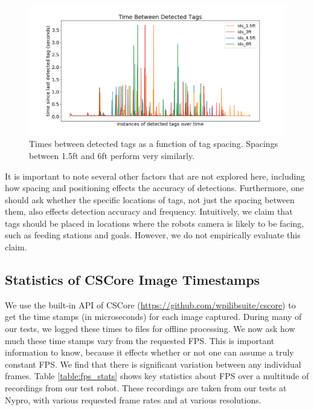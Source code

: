 \documentclass{article}
\begin{document}
    \begin{figure}[H]
      \centering
      \includegraphics[width=1\linewidth]{./images/spacing_times.png}
      \caption{Times between detected tags as a function of tag spacing. Spacings between 1.5ft and 6ft perform very similarly.}
      \label{fig:spacing_timing}
    \end{figure}


    It is important to note several other factors that are not explored here, including how spacing and positioning effects the accuracy of detections. Furthermore, one should ask whether the specific locations of tags, not just the spacing between them, also effects detection accuracy and frequency. Intuitively, we claim that tags should be placed in locations where the robots camera is likely to be facing, such as feeding stations and goals. However, we do not empirically evaluate this claim.

	\subsection{Statistics of CSCore Image Timestamps}

    We use the built-in API of CSCore (\url{https://github.com/wpilibsuite/cscore}) to get the time stamps (in microseconds) for each image captured. During many of our tests, we logged these times to files for offline processing. We now ask how much these time stamps vary from the requested FPS. This is important information to know, because it effects whether or not one can assume a truly constant FPS. We find that there is significant variation between any individual frames. Table \ref{table:fps_stats} shows key statistics about FPS over a multitude of recordings from our test robot. These recordings are taken from our tests at Nypro, with various requested frame rates and at various resolutions.
\end{document}
